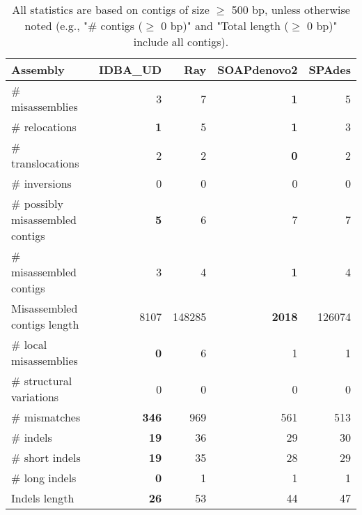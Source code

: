 \documentclass[12pt,a4paper]{article}
\begin{document}
\begin{table}[ht]
\begin{center}
\caption{All statistics are based on contigs of size $\geq$ 500 bp, unless otherwise noted (e.g., "\# contigs ($\geq$ 0 bp)" and "Total length ($\geq$ 0 bp)" include all contigs).}
\begin{tabular}{|l*{4}{|r}|}
\hline
Assembly & IDBA\_UD & Ray & SOAPdenovo2 & SPAdes \\ \hline
\# misassemblies & 3 & 7 & {\bf 1} & 5 \\ \hline
\hspace{5mm}\# relocations & {\bf 1} & 5 & {\bf 1} & 3 \\ \hline
\hspace{5mm}\# translocations & 2 & 2 & {\bf 0} & 2 \\ \hline
\hspace{5mm}\# inversions & 0 & 0 & 0 & 0 \\ \hline
\# possibly misassembled contigs & {\bf 5} & 6 & 7 & 7 \\ \hline
\# misassembled contigs & 3 & 4 & {\bf 1} & 4 \\ \hline
Misassembled contigs length & 8107 & 148285 & {\bf 2018} & 126074 \\ \hline
\# local misassemblies & {\bf 0} & 6 & 1 & 1 \\ \hline
\# structural variations & 0 & 0 & 0 & 0 \\ \hline
\# mismatches & {\bf 346} & 969 & 561 & 513 \\ \hline
\# indels & {\bf 19} & 36 & 29 & 30 \\ \hline
\hspace{5mm}\# short indels & {\bf 19} & 35 & 28 & 29 \\ \hline
\hspace{5mm}\# long indels & {\bf 0} & 1 & 1 & 1 \\ \hline
Indels length & {\bf 26} & 53 & 44 & 47 \\ \hline
\end{tabular}
\end{center}
\end{table}
\end{document}
